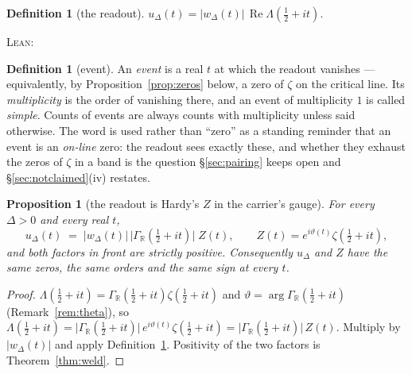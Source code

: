 \documentclass[11pt]{article}
\theoremstyle{plain}
\newtheorem{proposition}[theorem]{Proposition}
\theoremstyle{definition}
\newtheorem{definition}[theorem]{Definition}
\theoremstyle{remark}
\newcommand{\R}{\mathbb{R}}
\newcommand{\GR}{\Gamma_{\R}}
\newcommand{\leanref}[1]{%
  \par\nobreak\vspace{2pt}%
  {\footnotesize\raggedright\noindent\textsc{Lean:}~\texttt{\detokenize{#1}}\par}%
  \vspace{2pt}}
\begin{document}
\begin{definition}[the readout]\label{def:readout}
$u_\Delta(t)=\lvert w_\Delta(t)\rvert\,\operatorname{Re}\Lambda(\tfrac12+it)$.
\end{definition}
\leanref{weldReadout, xiRe}

\begin{definition}[event]\label{def:event}
An \emph{event} is a real $t$ at which the readout vanishes --- equivalently, by
Proposition~\ref{prop:zeros} below, a zero of $\zeta$ on the critical line. Its
\emph{multiplicity} is the order of vanishing there, and an event of multiplicity $1$
is called \emph{simple}. Counts of events are always counts with multiplicity unless
said otherwise. The word is used rather than ``zero'' as a standing reminder that an
event is an \emph{on-line} zero: the readout sees exactly these, and whether they
exhaust the zeros of $\zeta$ in a band is the question \S\ref{sec:pairing} keeps open
and \S\ref{sec:notclaimed}(iv) restates.
\end{definition}

\begin{proposition}[the readout is Hardy's $Z$ in the carrier's gauge]\label{prop:isZ}
For every $\Delta>0$ and every real $t$,
\[
  u_\Delta(t)\;=\;\lvert w_\Delta(t)\rvert\,\bigl\lvert\GR(\tfrac12+it)\bigr\rvert\;Z(t),
  \qquad Z(t)=e^{i\vartheta(t)}\zeta(\tfrac12+it),
\]
and both factors in front are strictly positive. Consequently $u_\Delta$ and $Z$ have the
same zeros, the same orders and the same sign at every $t$.
\end{proposition}

\begin{proof}
$\Lambda(\tfrac12+it)=\GR(\tfrac12+it)\zeta(\tfrac12+it)$ and
$\vartheta=\arg\GR(\tfrac12+it)$ (Remark~\ref{rem:theta}), so
$\Lambda(\tfrac12+it)=\lvert\GR(\tfrac12+it)\rvert\,e^{i\vartheta(t)}\zeta(\tfrac12+it)
=\lvert\GR(\tfrac12+it)\rvert\,Z(t)$. Multiply by $\lvert w_\Delta(t)\rvert$ and apply
Definition~\ref{def:readout}. Positivity of the two factors is
Theorem~\ref{thm:weld}.
\end{proof}
\end{document}

